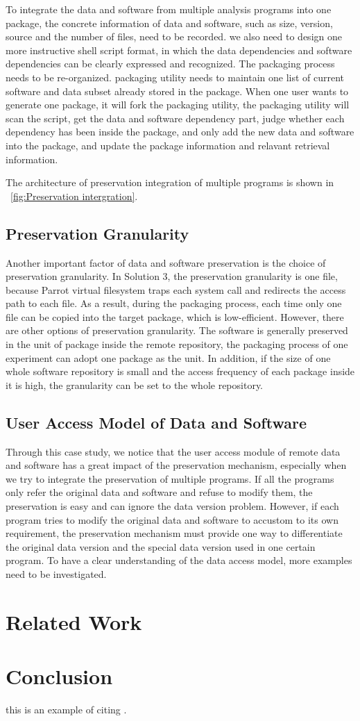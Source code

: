 \documentclass{acm_proc_article-sp}
\begin{document}
To integrate the data and software from multiple analysis programs into one package, the concrete information of data and software, such as size, version, source and the number of files, need to be recorded. we also need to design one more instructive shell script format, in which the data dependencies and software dependencies can be clearly expressed and recognized. The packaging process needs to be re-organized. packaging utility needs to maintain one list of current software and data subset already stored in the package. When one user wants to generate one package, it will fork the packaging utility, the packaging utility will scan the script, get the data and software dependency part, judge whether each dependency has been inside the package, and only add the new data and software into the package, and update the package information and relavant retrieval information.

The architecture of preservation integration of multiple programs is shown in ~\ref{fig:Preservation intergration}.

\subsection{Preservation Granularity}
Another important factor of data and software preservation is the choice of preservation granularity. In Solution 3, the preservation granularity is one file, because Parrot virtual filesystem traps each system call and redirects the access path to each file. As a result, during the packaging process, each time only one file can be copied into the target package, which is low-efficient. However, there are other options of preservation granularity. The software is generally preserved in the unit of package inside the remote repository, the packaging process of one experiment can adopt one package as the unit. In addition, if the size of one whole software repository is small and the access frequency of each package inside it is high, the granularity can be set to the whole repository.

\subsection{User Access Model of Data and Software}
Through this case study, we notice that the user access module of remote data and software has a great impact of the preservation mechanism, especially when we try to integrate the preservation of multiple programs. If all the programs only refer the original data and software and refuse to modify them, the preservation is easy and can ignore the data version problem. However, if each program tries to modify the original data and software to accustom to its own requirement, the preservation mechanism must provide one way to differentiate the original data version and the special data version used in one certain program. To have a clear understanding of the data access model, more examples need to be investigated.

\section{Related Work }

\section{Conclusion}

this is an example of citing \cite{Laboratories79make}. 



\end{document}
